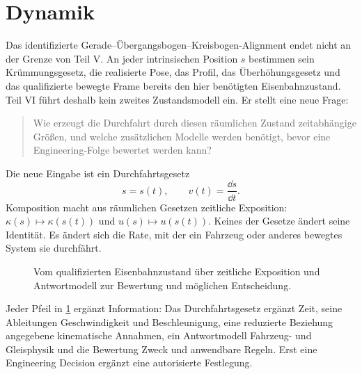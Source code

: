 
\chapter*{Dynamik}
{}

Das identifizierte Gerade--Übergangsbogen--Kreisbogen-Alignment endet nicht an
der Grenze von Teil V. An jeder intrinsischen Position \(s\) bestimmen sein
Krümmungsgesetz, die realisierte Pose, das Profil, das Überhöhungsgesetz und
das qualifizierte bewegte Frame bereits den hier benötigten Eisenbahnzustand.
Teil VI führt deshalb kein zweites Zustandsmodell ein. Er stellt eine neue
Frage:

\begin{quote}
Wie erzeugt die Durchfahrt durch diesen räumlichen Zustand zeitabhängige
Größen, und welche zusätzlichen Modelle werden benötigt, bevor eine
Engineering-Folge bewertet werden kann?
\end{quote}

Die neue Eingabe ist ein Durchfahrtsgesetz
\[
s=s(t),\qquad v(t)=\frac{\dd s}{\dd t}.
\]
Komposition macht aus räumlichen Gesetzen zeitliche Exposition:
\(\kappa(s)\mapsto\kappa(s(t))\) und \(u(s)\mapsto u(s(t))\).
Keines der Gesetze ändert seine Identität. Es ändert sich die Rate, mit der ein
Fahrzeug oder anderes bewegtes System sie durchfährt.

\begin{figure}[htbp]
\centering

\caption{Vom qualifizierten Eisenbahnzustand über zeitliche Exposition und Antwortmodell zur Bewertung und möglichen Entscheidung.}
\label{fig:space-to-time-dependency}
\end{figure}

Jeder Pfeil in \cref{fig:space-to-time-dependency} ergänzt Information:
Das Durchfahrtsgesetz ergänzt Zeit, seine Ableitungen Geschwindigkeit und
Beschleunigung, eine reduzierte Beziehung angegebene kinematische Annahmen,
ein Antwortmodell Fahrzeug- und Gleisphysik und die Bewertung Zweck und
anwendbare Regeln. Erst eine Engineering Decision ergänzt eine autorisierte
Festlegung.

